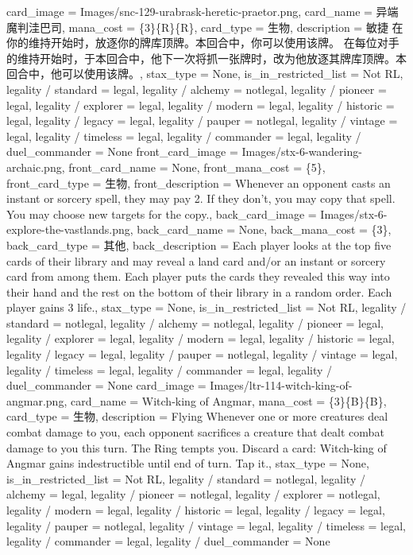 \documentclass[lang = cn, color = black, 10pt]{AllThatStax}
\begin{document}
\card
{
	card_image = Images/snc-129-urabrask-heretic-praetor.png,
	card_name = 异端魔判洼巴司,
	mana_cost = \{3\}\{R\}\{R\},
	card_type = 生物,
	description = 敏捷
	在你的维持开始时，放逐你的牌库顶牌。本回合中，你可以使用该牌。
	在每位对手的维持开始时，于本回合中，他下一次将抓一张牌时，改为他放逐其牌库顶牌。本回合中，他可以使用该牌。,
	stax_type = None,
	is_in_restricted_list = Not RL,
	legality / standard = legal,
	legality / alchemy = notlegal,
	legality / pioneer = legal,
	legality / explorer = legal,
	legality / modern = legal,
	legality / historic = legal,
	legality / legacy = legal,
	legality / pauper = notlegal,
	legality / vintage = legal,
	legality / timeless = legal,
	legality / commander = legal,
	legality / duel_commander = None
}
\mfcard
{
	front_card_image = Images/stx-6-wandering-archaic.png,
	front_card_name = None,
	front_mana_cost = \{5\},
	front_card_type = 生物,
	front_description = Whenever an opponent casts an instant or sorcery spell, they may pay {2}. If they don't, you may copy that spell. You may choose new targets for the copy.,
	back_card_image = Images/stx-6-explore-the-vastlands.png,
	back_card_name = None,
	back_mana_cost = \{3\},
	back_card_type = 其他,
	back_description = Each player looks at the top five cards of their library and may reveal a land card and/or an instant or sorcery card from among them. Each player puts the cards they revealed this way into their hand and the rest on the bottom of their library in a random order. Each player gains 3 life.,
	stax_type = None,
	is_in_restricted_list = Not RL,
	legality / standard = notlegal,
	legality / alchemy = notlegal,
	legality / pioneer = legal,
	legality / explorer = legal,
	legality / modern = legal,
	legality / historic = legal,
	legality / legacy = legal,
	legality / pauper = notlegal,
	legality / vintage = legal,
	legality / timeless = legal,
	legality / commander = legal,
	legality / duel_commander = None
}
\card
{
	card_image = Images/ltr-114-witch-king-of-angmar.png,
	card_name = Witch-king of Angmar,
	mana_cost = \{3\}\{B\}\{B\},
	card_type = 生物,
	description = Flying
	Whenever one or more creatures deal combat damage to you, each opponent sacrifices a creature that dealt combat damage to you this turn. The Ring tempts you.
	Discard a card: Witch-king of Angmar gains indestructible until end of turn. Tap it.,
	stax_type = None,
	is_in_restricted_list = Not RL,
	legality / standard = notlegal,
	legality / alchemy = legal,
	legality / pioneer = notlegal,
	legality / explorer = notlegal,
	legality / modern = legal,
	legality / historic = legal,
	legality / legacy = legal,
	legality / pauper = notlegal,
	legality / vintage = legal,
	legality / timeless = legal,
	legality / commander = legal,
	legality / duel_commander = None
}
\end{document}
